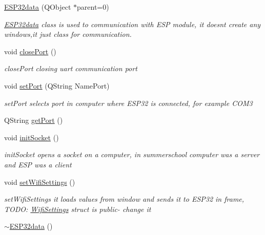 \begin{DoxyCompactItemize}
\item 
\hyperlink{class_e_s_p32data_a23df6c4c56c578b115900d767280ed78}{E\+S\+P32data} (Q\+Object $\ast$parent=0)
\begin{DoxyCompactList}\small\item\em \hyperlink{class_e_s_p32data}{E\+S\+P32data} class is used to communication with E\+SP module, it doesn\textquotesingle{}t create any windows,it just class for communication. \end{DoxyCompactList}\item 
void \hyperlink{class_e_s_p32data_a74a82e4ce7f99e01b1c9e1f6e3cd6333}{close\+Port} ()
\begin{DoxyCompactList}\small\item\em close\+Port closing uart communication port \end{DoxyCompactList}\item 
void \hyperlink{class_e_s_p32data_a6681c1880617d85c2dfe2dac976aa021}{set\+Port} (Q\+String Name\+Port)
\begin{DoxyCompactList}\small\item\em set\+Port selects port in computer where E\+S\+P32 is connected, for example C\+O\+M3 \end{DoxyCompactList}\item 
Q\+String \hyperlink{class_e_s_p32data_a7f451228e41241eb51347d6453f30590}{get\+Port} ()
\item 
void \hyperlink{class_e_s_p32data_a48f03ba841041fd88b8c60659ef36064}{init\+Socket} ()
\begin{DoxyCompactList}\small\item\em init\+Socket opens a socket on a computer, in summerschool computer was a server and E\+SP was a client \end{DoxyCompactList}\item 
void \hyperlink{class_e_s_p32data_ac4d3568c735d68b89cc5c7d59ccce8e7}{set\+Wifi\+Settings} ()
\begin{DoxyCompactList}\small\item\em set\+Wifi\+Settings it loads values from window and sends it to E\+S\+P32 in frame, T\+O\+DO\+: \hyperlink{struct_e_s_p32data_1_1_wifi_settings}{Wifi\+Settings} struct is public-\/ change it \end{DoxyCompactList}\item 
\hyperlink{class_e_s_p32data_ae250e8a91371316a8104e65328cef89d}{$\sim$\+E\+S\+P32data} ()
\end{DoxyCompactItemize}

